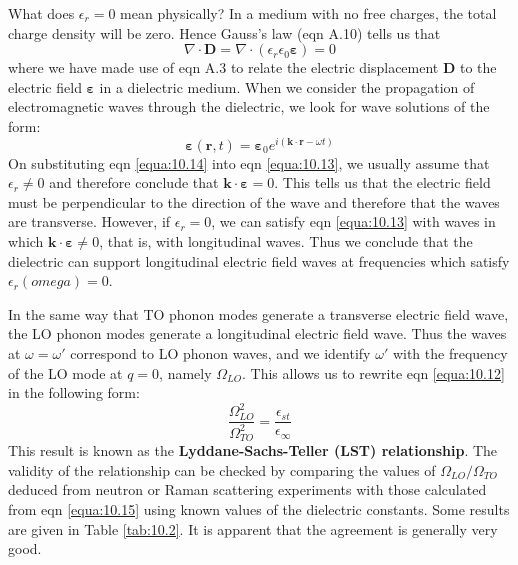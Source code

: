 \documentclass[12pt]{book}
\begin{document}
{What does $\epsilon_r=0$ mean physically? In a medium with no free charges, the total charge density will be zero. Hence Gauss's law (eqn A.10) tells us that
\begin{equation}\label{equa:10.13}
  \nabla\cdot\mathbf{D}=\nabla\cdot(\epsilon_r\epsilon_0\boldsymbol{\varepsilon})=0
\end{equation}
where we have made use of eqn A.3 to relate the electric displacement $\mathbf{D}$ to the electric field $\boldsymbol{\varepsilon}$ in a dielectric medium. When we consider the propagation of electromagnetic waves through the dielectric, we look for wave solutions of the form:
\begin{equation}\label{equa:10.14}
  \boldsymbol{\varepsilon}(\mathbf{r},t)=\boldsymbol{\varepsilon}_0e^{i(\mathbf{k}\cdot\mathbf{r}-\omega t)}
\end{equation}
On substituting eqn \ref{equa:10.14} into eqn \ref{equa:10.13}, we usually assume that $\epsilon_r\neq0$ and therefore conclude that $\mathbf{k}\cdot\boldsymbol{\varepsilon}=0$. This tells us that the electric field must be perpendicular to the direction of the wave and therefore that the waves are transverse. However, if $\epsilon_r=0$, we can satisfy eqn \ref{equa:10.13} with waves in which $\mathbf{k}\cdot\boldsymbol{\varepsilon}\neq0$, that is, with longitudinal waves. Thus we conclude that the dielectric can support longitudinal electric field waves at frequencies which satisfy $\epsilon_r(omega)=0$.

In the same way that TO phonon modes generate a transverse electric field wave, the LO phonon modes generate a longitudinal electric field wave. Thus the waves at $\omega=\omega'$ correspond to LO phonon waves, and we identify $\omega'$ with the frequency of the LO mode at $q=0$, namely $\Omega_{LO}$. This allows us to rewrite eqn \ref{equa:10.12} in the following form:
\begin{equation}\label{equa:10.15}
  \frac{\Omega_{LO}^2}{\Omega_{TO}^2}=\frac{\epsilon_{st}}{\epsilon_{\infty}}
\end{equation}
This result is known as the \textbf{Lyddane-Sachs-Teller (LST) relationship}. The validity of the relationship can be checked by comparing the values of $\Omega_{LO}/\Omega_{TO}$ deduced from neutron or Raman scattering experiments with those calculated from eqn \ref{equa:10.15} using known values of the dielectric constants. Some results are given in Table \ref{tab:10.2}. It is apparent that the agreement is generally very good.

}
\end{document}
